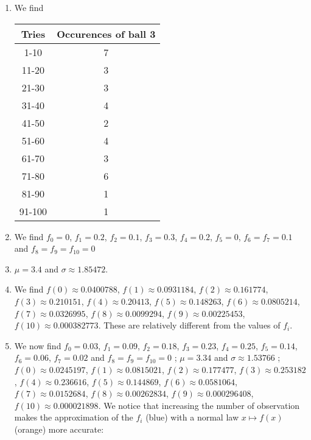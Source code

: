 \begin{enumerate}
\item We find

\begin{tabular}{| c | c |}
  \hline
  Tries &  Occurences of ball 3 \\
  \hline
  1-10 &  7 \\
  \hline
  11-20 & 3 \\
  \hline
  21-30 & 3 \\
  \hline
  31-40 & 4 \\
  \hline
  41-50 & 2 \\
  \hline
  51-60 & 4 \\
  \hline
  61-70 & 3 \\
  \hline
  71-80 & 6 \\
  \hline
  81-90 & 1 \\
  \hline
  91-100 & 1 \\
  \hline
\end{tabular}

\item We find
$f_0=0$,
$f_1=0.2$,
$f_2=0.1$,
$f_3=0.3$,
$f_4=0.2$,
$f_5=0$,
$f_6=f_7=0.1$ and
$f_8=f_9=f_{10}=0$

\item $\mu=3.4$ and $\sigma \approx 1.85472$.

\item We find
$f(0)\approx0.0400788$,
$f(1)\approx0.0931184$,
$f(2)\approx0.161774$,
$f(3)\approx0.210151$,
$f(4)\approx0.20413$,
$f(5)\approx0.148263$,
$f(6)\approx0.0805214$,
$f(7)\approx0.0326995$,
$f(8)\approx0.0099294$,
$f(9)\approx0.00225453$,
$f(10)\approx0.000382773$.
  These are relatively different from the values of $f_i$.

\item We now find
$f_0=0.03$,
$f_1=0.09$,
$f_2=0.18$,
$f_3=0.23$,
$f_4=0.25$,
$f_5=0.14$,
$f_6=0.06$,
$f_7=0.02$ and
  $f_8=f_9=f_{10}=0$ ;
  $\mu=3.34$ and $\sigma \approx 1.53766$ ;
$f(0)\approx0.0245197$,
$f(1)\approx0.0815021$,
$f(2)\approx0.177477$,
$f(3)\approx0.253182$,
$f(4)\approx0.236616$,
$f(5)\approx0.144869$,
$f(6)\approx0.0581064$,
$f(7)\approx0.0152684$,
$f(8)\approx0.00262834$,
$f(9)\approx0.000296408$,
  $f(10)\approx0.000021898$.
  We notice that increasing the number of observation makes the approximation
  of the $f_i$ (blue) with a normal law $x \mapsto f(x)$ (orange) more accurate:


\end{enumerate}
